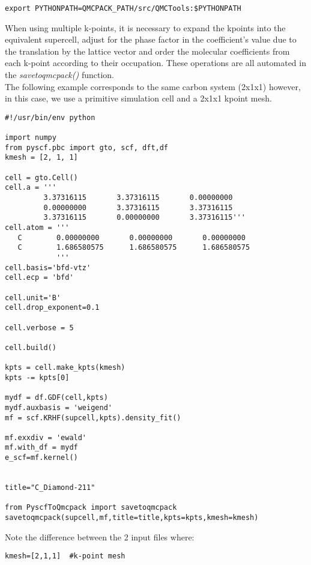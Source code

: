 \begin{lstlisting}[style=SHELL]
export PYTHONPATH=QMCPACK_PATH/src/QMCTools:$PYTHONPATH
\end{lstlisting}

When using multiple k-points, it is necessary to expand the kpoints into the equivalent supercell, adjust for the phase factor in the coefficient's value due to the translation by the lattice vector and order the molecular coefficients from each k-point according to their occupation. These operations are all automated in the \textit{savetoqmcpack()} function.\\

The following example corresponds to the same carbon system (2x1x1) however, in this case, we use a primitive simulation cell and a 2x1x1 kpoint mesh.   

\begin{lstlisting}[style=Python,caption=Example PySCF input for single k-point calculation for a 2x1x1 Carbon supercell.]
#!/usr/bin/env python

import numpy
from pyscf.pbc import gto, scf, dft,df
kmesh = [2, 1, 1]

cell = gto.Cell()
cell.a = '''
         3.37316115       3.37316115       0.00000000
         0.00000000       3.37316115       3.37316115
         3.37316115       0.00000000       3.37316115'''
cell.atom = '''  
   C        0.00000000       0.00000000       0.00000000
   C        1.686580575      1.686580575      1.686580575 
            '''
cell.basis='bfd-vtz'
cell.ecp = 'bfd'

cell.unit='B'
cell.drop_exponent=0.1

cell.verbose = 5

cell.build()

kpts = cell.make_kpts(kmesh)
kpts -= kpts[0]

mydf = df.GDF(cell,kpts)
mydf.auxbasis = 'weigend'
mf = scf.KRHF(supcell,kpts).density_fit()

mf.exxdiv = 'ewald'
mf.with_df = mydf
e_scf=mf.kernel()


title="C_Diamond-211"

from PyscfToQmcpack import savetoqmcpack
savetoqmcpack(supcell,mf,title=title,kpts=kpts,kmesh=kmesh)

\end{lstlisting}



Note the difference between the 2 input files where:\\
\begin{lstlisting}
kmesh=[2,1,1]  #k-point mesh
\end{lstlisting}

